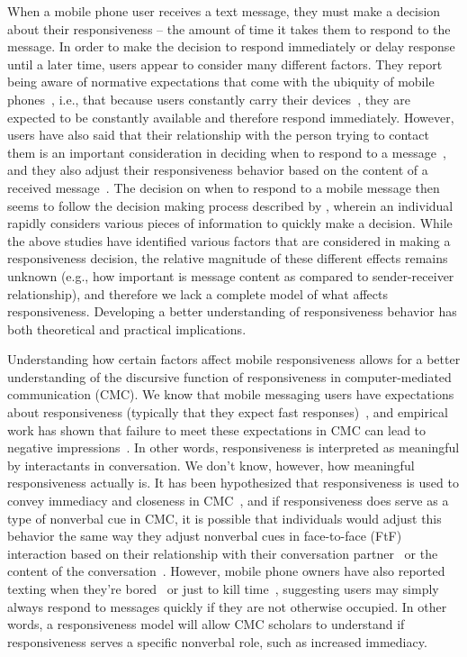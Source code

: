 \documentclass[12pt]{nuthesis}	%
\begin{document}
When a mobile phone user receives a text message, they must make a decision about their responsiveness -- the amount of time it takes them to respond to the message. In order to make the decision to respond immediately or delay response until a later time, users appear to consider many different factors. They report being aware of normative expectations that come with the ubiquity of mobile phones~\citep{church2012wanted,licoppe200811}, i.e., that because users constantly carry their devices~\citep{oksman2003perhaps,rainie2015americans,turkle2008always}, they are expected to be constantly available and therefore respond immediately. However, users have also said that their relationship with the person trying to contact them is an important consideration in deciding when to respond to a message~\citep{grandhi2010technology,wohn2015ambient}, and they also adjust their responsiveness behavior based on the content of a received message~\citep{dabbish2005understanding}. The decision on when to respond to a mobile message then seems to follow the decision making process described by \citet{zsambok2014naturalistic}, wherein an individual rapidly considers various pieces of information to quickly make a decision. While the above studies have identified various factors that are considered in making a responsiveness decision, the relative magnitude of these different effects remains unknown (e.g., how important is message content as compared to sender-receiver relationship), and therefore we lack a complete model of what affects responsiveness. Developing a better understanding of responsiveness behavior has both theoretical and practical implications.

Understanding how certain factors affect mobile responsiveness allows for a better understanding of the discursive function of responsiveness in computer-mediated communication (CMC). We know that mobile messaging users have expectations about responsiveness (typically that they expect fast responses)~\citep{church2013s}, and empirical work has shown that failure to meet these expectations in CMC can lead to negative impressions~\citep{heston2017worth,kalman2011online}. In other words, responsiveness is interpreted as meaningful by interactants in conversation. We don't know, however, how meaningful responsiveness actually is. It has been hypothesized that responsiveness is used to convey immediacy and closeness in CMC~\citep{kalman2006pauses,walther1995nonverbal}, and if responsiveness does serve as a type of nonverbal cue in CMC, it is possible that individuals would adjust this behavior the same way they adjust nonverbal cues in face-to-face (FtF) interaction based on their relationship with their conversation partner~\citep{brown1987politeness,locher2005politeness} or the content of the conversation~\citep{levinson1981essential}.  However, mobile phone owners have also reported texting when they're bored~\citep{ling2005nascent} or just to kill time~\citep{battestini2010large}, suggesting users may simply always respond to messages quickly if they are not otherwise occupied. In other words, a responsiveness model will allow CMC scholars to understand if responsiveness serves a specific nonverbal role, such as increased immediacy.
\end{document}
